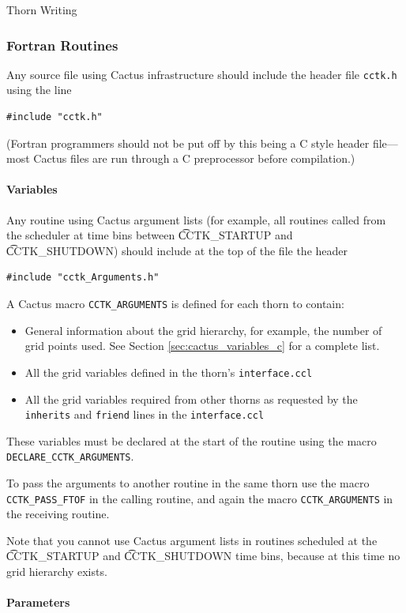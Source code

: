 \begin{cactuspart}{Thorn Writing}
\subsubsection{Fortran Routines}

Any source file using Cactus infrastructure should include
the header file \texttt{cctk.h} using the line
\begin{verbatim}
#include "cctk.h"
\end{verbatim}
(Fortran programmers should not be put off by this being a C style
header file---most Cactus files are run through a C preprocessor
before compilation.)

\paragraph{Variables}

Any routine using Cactus argument lists (for example, all routines called from
the scheduler at time bins between {\t CCTK\_STARTUP} and {\t CCTK\_SHUTDOWN})
should include at the top of the file the header
\begin{verbatim}
#include "cctk_Arguments.h"
\end{verbatim}

A Cactus macro \texttt{CCTK\_ARGUMENTS} is defined for each thorn
to contain:
\begin{itemize}
\item General information about the grid hierarchy, for example, the number
      of grid points used. See Section \ref{sec:cactus_variables_c} for a
      complete list.
\item All the grid variables defined in the thorn's \texttt{interface.ccl}
\item All the grid variables required from other thorns as requested by
      the \texttt{inherits} and \texttt{friend} lines in the \texttt{interface.ccl}
\end{itemize}
These variables must be declared at the start of the routine using
the macro \texttt{DECLARE\_CCTK\_ARGUMENTS}.

To pass the arguments to another routine in the same thorn use the macro
\texttt{CCTK\_PASS\_FTOF} in the calling routine, and again the macro
\texttt{CCTK\_ARGUMENTS} in the receiving routine.

Note that you cannot use Cactus argument lists in routines scheduled at the
{\t CCTK\_STARTUP} and {\t CCTK\_SHUTDOWN} time bins, because at this time
no grid hierarchy exists.


\paragraph{Parameters}


\end{cactuspart}
